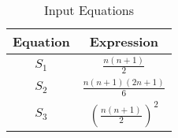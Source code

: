 \documentclass[12pt]{article}
\begin{document}
\begin{table}[h]
  \centering
  \caption{Input Equations}
  \label{tab:input-equations}
  \begin{tabular}{|c|c|}
    \hline
    \textbf{Equation} & \textbf{Expression} \\
    \hline
    \(S_1\) & $\frac{n(n+1)}{2}$ \\
    \(S_2\) & $\frac{n(n+1)(2n+1)}{6}$ \\
    \(S_3\) & $\left(\frac{n(n+1)}{2}\right)^2$ \\
    \hline
  \end{tabular}
\end{table}
\end{document}
